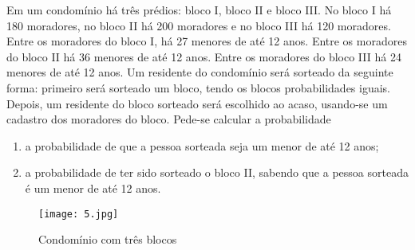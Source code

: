 \documentclass[10 pt,usenames,dvipsnames, oneside]{article}
\begin{document}
Em um condomínio há três prédios: bloco I, bloco II e bloco III. No bloco I há 180 moradores, no bloco II há 200 moradores e no bloco III há 120 moradores. Entre os moradores do bloco I, há 27 menores de até 12 anos. Entre os moradores do bloco II há 36 menores de até 12 anos. Entre os moradores do bloco III há 24 menores de até 12 anos. Um residente do condomínio será sorteado da seguinte forma: primeiro será sorteado um bloco, tendo os blocos probabilidades iguais.  Depois, um residente do bloco sorteado será escolhido ao acaso, usando-se um cadastro dos moradores do bloco. Pede-se calcular a probabilidade
\begin{enumerate}
\item {} 
a probabilidade de que a pessoa sorteada seja um menor de até 12 anos;

\item {} 
a probabilidade de ter sido sorteado o bloco II, sabendo que a pessoa sorteada é um menor de até 12 anos.
  
\end{enumerate}

\begin{figure}[H]
\centering

\noindent\texttt{[image: 5.jpg]}

\caption{Condomínio com três blocos}
\end{figure}
\end{document}
